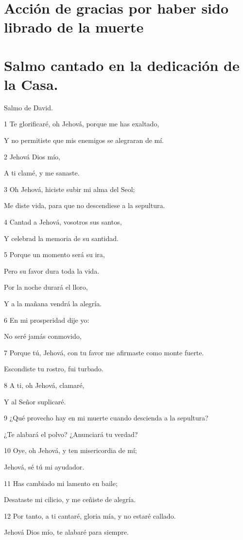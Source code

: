 \section*{Acción de gracias por haber sido librado de la muerte}

\section*{Salmo cantado en la dedicación de la Casa.}

\par Salmo de David.

\par 1 Te glorificaré, oh Jehová, porque me has exaltado,
\par Y no permitiste que mis enemigos se alegraran de mí.
\par 2 Jehová Dios mío,
\par A ti clamé, y me sanaste.
\par 3 Oh Jehová, hiciste subir mi alma del Seol;
\par Me diste vida, para que no descendiese a la sepultura.
\par 4 Cantad a Jehová, vosotros sus santos,
\par Y celebrad la memoria de su santidad.
\par 5 Porque un momento será su ira,
\par Pero su favor dura toda la vida.
\par Por la noche durará el lloro,
\par Y a la mañana vendrá la alegría.
\par 6 En mi prosperidad dije yo:
\par No seré jamás conmovido,
\par 7 Porque tú, Jehová, con tu favor me afirmaste como monte fuerte.
\par Escondiste tu rostro, fui turbado.
\par 8 A ti, oh Jehová, clamaré,
\par Y al Señor suplicaré.
\par 9 ¿Qué provecho hay en mi muerte cuando descienda a la sepultura?
\par ¿Te alabará el polvo? ¿Anunciará tu verdad?
\par 10 Oye, oh Jehová, y ten misericordia de mí;
\par Jehová, sé tú mi ayudador.
\par 11 Has cambiado mi lamento en baile;
\par Desataste mi cilicio, y me ceñiste de alegría.
\par 12 Por tanto, a ti cantaré, gloria mía, y no estaré callado.
\par Jehová Dios mío, te alabaré para siempre.

